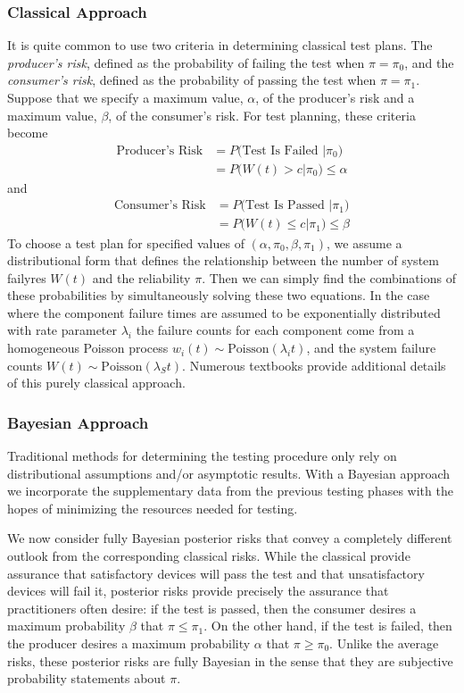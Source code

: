 \documentclass[12pt]{article}
\begin{document}
\subsubsection{Classical Approach}
It is quite common to use two criteria in determining classical test plans. The
\emph{producer's risk}, defined as the probability of failing the test when $\pi =
\pi_0$, and the \emph{consumer's risk}, defined as the probability of passing
the test when $\pi = \pi_1$.  Suppose that we specify a maximum value, $\alpha$,
of the producer's risk and a maximum value, $\beta$, of the consumer's risk. For
test planning, these criteria become
$$
\begin{aligned}
	\text{Producer's Risk} &= P \text{(Test Is Failed } \vert \pi_0 \text{)} \\ &=
	P \text{(} W(t) > c \vert \pi_0 \text{)} \leq \alpha
\end{aligned}
$$
and
$$
\begin{aligned}
	\text{Consumer's Risk} &= P \text{(Test Is Passed } \vert \pi_1 \text{)} \\ &=
	P \text{(} W(t) \leq c \vert \pi_1 \text{)} \leq \beta
\end{aligned}
$$
To choose a test plan for specified values of $(\alpha, \pi_0, \beta, \pi_1)$,
we assume a distributional form that defines the relationship between the number
of system failyres $W(t)$ and the reliability $\pi$.  Then we can simply find
the combinations of these probabilities by simultaneously solving these two
equations.  In the case where the component failure times are assumed to be
exponentially distributed with rate parameter $\lambda_i$ the failure counts for
each component come from a homogeneous Poisson process $w_i(t) \sim
\text{Poisson}(\lambda_i t)$, and the system failure counts $W(t) \sim
\text{Poisson}(\lambda_S t)$.  Numerous textbooks provide additional details of
this purely classical approach.

\subsubsection{Bayesian Approach}
Traditional methods for determining the testing procedure only rely on
distributional assumptions and/or asymptotic results. With a Bayesian approach we
incorporate the supplementary data from the previous testing phases with the
hopes of minimizing the resources needed for testing.

We now consider fully Bayesian posterior risks that convey a completely
different outlook from the corresponding classical risks. While the classical
provide assurance that satisfactory devices will pass the test and that
unsatisfactory devices will fail it, posterior risks provide precisely the
assurance that practitioners often desire: if the test is passed, then the
consumer desires a maximum probability $\beta$ that $\pi \leq \pi_1$. On the
other hand, if the test is failed, then the producer desires a maximum
probability $\alpha$ that $\pi \geq \pi_0$. Unlike the average risks, these
posterior risks are fully Bayesian in the sense that they are subjective
probability statements about $\pi$.
\end{document}
